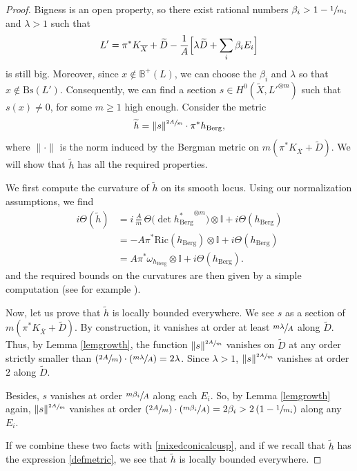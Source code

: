 \documentclass[JEP,XML,SOM,Unicode]{cedram}
\newcommand{\Psfrac}[2]{(\sfrac{#1}{#2})}
\theoremstyle{plain}
\theoremstyle{definition}
\numberwithin{equation}{theorem}
\newcommand{\norm}[1] { \| #1 \| }
\begin{document}
\begin{proof}
Bigness is an open property, so there exist rational numbers $\beta_i > 1 - \sfrac{1}{m_i}$ and $\lambda > 1$ such that
$$
L' = \pi^\ast K_{\overline{X}} + \widetilde{D} - \frac{1}{A} \Bigl[ \lambda \widetilde{D} + \sum_i \beta_i E_i \Bigr]
$$
is still big. Moreover, since $x \not\in \mathbb B^+ (L)$, we can choose the $\beta_i$ and $\lambda$ so that $x \not\in \mathrm{Bs}(L')$. Consequently, we can find a section $s \in H^0(\widetilde{X}, L'^{\otimes m})$ such that $s(x) \neq 0$, for some $m \geq 1$ high enough. Consider the metric
\begin{equation} \label{defmetric}
\widetilde{h} = \norm{s}^{\sfrac{2 A}{m}}\cdot \pi^\ast h_{\mathrm{Berg}},
\end{equation}
where $\norm{\cdot}$ is the norm induced by the Bergman metric on $m ( \pi^\ast K_{\overline{X}} + \widetilde{D} )$. We will show that $\widetilde{h}$ has all the required properties.

We first compute the curvature of $\widetilde{h}$ on its smooth locus. Using our normalization assumptions, we find
\begin{align*}
i \Theta(\widetilde{h}) & = i \,\frac{A}{m}\, \Theta \bigl( \det {h^\ast_{\mathrm{Berg}}}^{\otimes m} \bigr) \otimes \mathbb{I} + i \Theta(h_{\mathrm{Berg}}) \\
	& = - A \pi^\ast \mathrm{Ric} (h_{\mathrm{Berg}}) \otimes \mathbb I+ i \Theta(h_{\mathrm{Berg}}) \\
	& = A \pi^\ast \omega_{h_{\mathrm{Berg}}} \otimes \mathbb I+ i \Theta(h_{\mathrm{Berg}}).
\end{align*}
and the required bounds on the curvatures are then given by a simple computation (see for example \cite{cad16}).

Now, let us prove that $\widetilde{h}$ is locally bounded everywhere. We see $s$ as a section of $m( \pi^\ast K_{\overline{X}} + \widetilde{D})$. By construction, it vanishes at order at least $\sfrac{m \lambda}{A}$ along $\widetilde{D}$. Thus, by Lemma \ref{lemgrowth}, the function $\norm{s}^{\sfrac{2A}{m}}$ vanishes on $\widetilde{D}$ at any order strictly smaller than $\Psfrac{2 A}{m} \cdot \Psfrac{m\lambda}{A} = 2 \lambda$. Since $\lambda > 1$, $\norm{s}^{\sfrac{2 A}{m}}$ vanishes at order $2$ along $\widetilde{D}$.

Besides, $s$ vanishes at order $\sfrac{m \beta_i}{A}$ along each $E_i$. So, by Lemma \ref{lemgrowth} again, $\norm{s}^{\sfrac{2A}{m}}$ vanishes at order $\Psfrac{2A}{m} \cdot \Psfrac{m \beta_i}{A} = 2 \beta_i > 2 \left( 1 - \sfrac{1}{m_i} \right)$ along any $E_i$.

If we combine these two facts with \eqref{mixedconicalcusp}, and if we recall that $\widetilde{h}$ has the expression \eqref{defmetric}, we see that $\widetilde{h}$ is locally bounded everywhere.
\end{proof}
\end{document}
